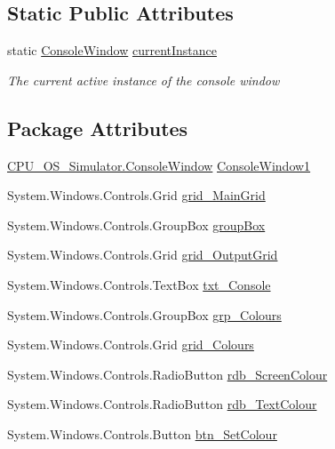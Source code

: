 \subsection*{Static Public Attributes}
\begin{DoxyCompactItemize}
\item 
static \hyperlink{class_c_p_u___o_s___simulator_1_1_console_window}{Console\+Window} \hyperlink{class_c_p_u___o_s___simulator_1_1_console_window_abee2fd1e118dd4f81dc2142bc033da4a}{current\+Instance}
\begin{DoxyCompactList}\small\item\em The current active instance of the console window \end{DoxyCompactList}\end{DoxyCompactItemize}
\subsection*{Package Attributes}
\begin{DoxyCompactItemize}
\item 
\hyperlink{class_c_p_u___o_s___simulator_1_1_console_window}{C\+P\+U\+\_\+\+O\+S\+\_\+\+Simulator.\+Console\+Window} \hyperlink{class_c_p_u___o_s___simulator_1_1_console_window_aac987ccfb7f82cf736d42355f96e886b}{Console\+Window1}
\item 
System.\+Windows.\+Controls.\+Grid \hyperlink{class_c_p_u___o_s___simulator_1_1_console_window_a28c9b155f3287ca00079175dc675eee4}{grid\+\_\+\+Main\+Grid}
\item 
System.\+Windows.\+Controls.\+Group\+Box \hyperlink{class_c_p_u___o_s___simulator_1_1_console_window_ad2d026ec9701c1b7c36dc5038927f1ab}{group\+Box}
\item 
System.\+Windows.\+Controls.\+Grid \hyperlink{class_c_p_u___o_s___simulator_1_1_console_window_afef6d481c8b608672b98da16721143b0}{grid\+\_\+\+Output\+Grid}
\item 
System.\+Windows.\+Controls.\+Text\+Box \hyperlink{class_c_p_u___o_s___simulator_1_1_console_window_ad1d4a0c5f573c7e89c8d6ed57d5097e0}{txt\+\_\+\+Console}
\item 
System.\+Windows.\+Controls.\+Group\+Box \hyperlink{class_c_p_u___o_s___simulator_1_1_console_window_aefc749577a14756234b1a73c0a4a6f50}{grp\+\_\+\+Colours}
\item 
System.\+Windows.\+Controls.\+Grid \hyperlink{class_c_p_u___o_s___simulator_1_1_console_window_a0d262972210c72305e20330f5dda9388}{grid\+\_\+\+Colours}
\item 
System.\+Windows.\+Controls.\+Radio\+Button \hyperlink{class_c_p_u___o_s___simulator_1_1_console_window_a1ce1d3ba71dbca9bee53bf6b9c474787}{rdb\+\_\+\+Screen\+Colour}
\item 
System.\+Windows.\+Controls.\+Radio\+Button \hyperlink{class_c_p_u___o_s___simulator_1_1_console_window_a6086d1a5ddaadd584ec129c7372359e2}{rdb\+\_\+\+Text\+Colour}
\item 
System.\+Windows.\+Controls.\+Button \hyperlink{class_c_p_u___o_s___simulator_1_1_console_window_a374a86e391068f8d05edb9649ce3d7f4}{btn\+\_\+\+Set\+Colour}
\end{DoxyCompactItemize}
